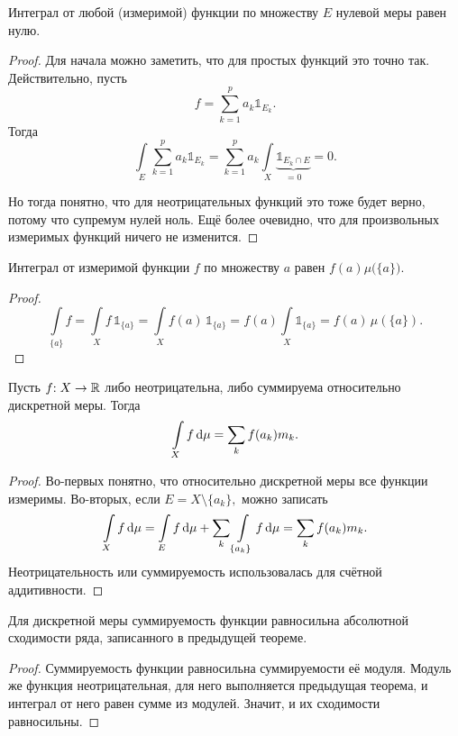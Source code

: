 \documentclass{notes}
\begin{document}
	\begin{lm}
		Интеграл от любой (измеримой) функции по множеству $E$ нулевой меры равен нулю.
		\begin{proof}
			Для начала можно заметить, что для простых функций это точно так. Действительно, пусть
			\[
				f = \sum\limits_{k = 1}^p a_k \mathbb{1}_{E_k}.
			\]
			Тогда
			\[
				\int\limits_{E} \sum\limits_{k = 1}^p a_k \mathbb{1}_{E_k} = \sum\limits_{k = 1}^p a_k \int\limits_{X} \underbrace{\mathbb{1}_{E_k \cap E}}_{=0} = 0.
			\]

			Но тогда понятно, что для неотрицательных функций это тоже будет верно, потому что супремум нулей ноль. Ещё более очевидно, что для произвольных измеримых функций ничего не изменится.
		\end{proof}
	\end{lm}

	\begin{lm}
		Интеграл от измеримой функции $f$ по множеству ${a}$ равен $f(a) \mu\big(\{a\}\big)$.
		\begin{proof}
			\[
				\int\limits_{\{a\}} f = \int\limits_{X} f \, \mathbb{1}_{\{a\}} = \int\limits_{X} f(a) \, \mathbb{1}_{\{a\}} = f(a) \int\limits_{X} \mathbb{1}_{\{a\}} = f(a) \, \mu(\{a\}).
			\]
		\end{proof}
	\end{lm}

	\begin{thm}
		Пусть $f\text{\text{:}} \; X \to \mathbb{R}$ либо неотрицательна, либо суммируема относительно дискретной меры. Тогда
		\[
			\int\limits_{X} f \, \mathrm{d} \mu = \sum\limits_k f(a_k) m_k.
		\]
		\begin{proof}
			Во-первых понятно, что относительно дискретной меры все функции измеримы. Во-вторых, если $E = X \setminus \{a_k\},$ можно записать
			\[
				\int\limits_{X} f \, \mathrm{d} \mu = \int\limits_{E} f \, \mathrm{d} \mu + \sum\limits_{k} \int\limits_{\{a_k\}} f \, \mathrm{d} \mu = \sum\limits_k f(a_k) m_k.
			\]
			Неотрицательность или суммируемость использовалась для счётной аддитивности.
		\end{proof}
	\end{thm}

	\begin{st}
		Для дискретной меры суммируемость функции равносильна абсолютной сходимости ряда, записанного в предыдущей теореме.
		\begin{proof}
			Суммируемость функции равносильна суммируемости её модуля. Модуль же функция неотрицательная, для него выполняется предыдущая теорема, и интеграл от него равен сумме из модулей. Значит, и их сходимости равносильны.
		\end{proof}
	\end{st}
\end{document}
